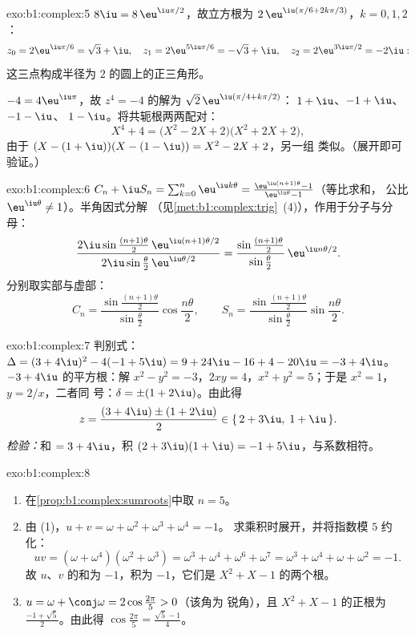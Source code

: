 \begin{solution}{exo:b1:complex:5}
$8\iu = 8\,\eu^{\iu\pi/2}$，故立方根为 $2\,\eu^{\iu(\pi/6 +
2k\pi/3)}$，$k = 0, 1, 2$：
\[
z_0 = 2\eu^{\iu\pi/6} = \sqrt 3 + \iu,\quad
z_1 = 2\eu^{5\iu\pi/6} = -\sqrt 3 + \iu,\quad
z_2 = 2\eu^{3\iu\pi/2} = -2\iu :
\]
这三点构成半径为 $2$ 的圆上的正三角形。

$-4 = 4\eu^{\iu\pi}$，故 $z^4 = -4$ 的解为 $\sqrt 2\,
\eu^{\iu(\pi/4 + k\pi/2)}$：$\;1 + \iu$、$-1 + \iu$、$-1 - \iu$、
$1 - \iu$。将共轭根两两配对：
\[
X^4 + 4 = \bigl(X^2 - 2X + 2\bigr)\bigl(X^2 + 2X + 2\bigr),
\]
由于 $(X - (1+\iu))(X - (1-\iu)) = X^2 - 2X + 2$，另一组
类似。（展开即可验证。）
\end{solution}

\begin{solution}{exo:b1:complex:6}
$C_n + \iu S_n = \sum_{k=0}^{n} \eu^{\iu k\theta} =
\frac{\eu^{\iu(n+1)\theta} - 1}{\eu^{\iu\theta} - 1}$（等比求和，
公比 $\eu^{\iu\theta} \neq 1$）。半角因式分解
（见\cref{met:b1:complex:trig}~(4)），作用于分子与分母：
\[
\frac{2\iu\sin\frac{(n+1)\theta}{2}\, \eu^{\iu(n+1)\theta/2}}
{2\iu\sin\frac{\theta}{2}\, \eu^{\iu\theta/2}}
= \frac{\sin\frac{(n+1)\theta}{2}}{\sin\frac{\theta}{2}}\,
\eu^{\iu n\theta/2}.
\]
分别取实部与虚部：
\[
C_n = \frac{\sin\frac{(n+1)\theta}{2}}{\sin\frac{\theta}{2}}
\cos\frac{n\theta}{2},
\qquad
S_n = \frac{\sin\frac{(n+1)\theta}{2}}{\sin\frac{\theta}{2}}
\sin\frac{n\theta}{2}.
\]
\end{solution}

\begin{solution}{exo:b1:complex:7}
判别式：$\Delta = (3 + 4\iu)^2 - 4(-1 + 5\iu) = 9 + 24\iu - 16 +
4 - 20\iu = -3 + 4\iu$。$-3 + 4\iu$ 的平方根：解 $x^2 - y^2
= -3$，$2xy = 4$，$x^2 + y^2 = 5$；于是 $x^2 = 1$，$y = 2/x$，二者同
号：$\delta = \pm(1 + 2\iu)$。由此得
\[
z = \frac{(3 + 4\iu) \pm (1 + 2\iu)}{2}
\in \{\, 2 + 3\iu,\; 1 + \iu \,\}.
\]
\emph{检验：}和 $= 3 + 4\iu$，积 $(2+3\iu)(1+\iu) = -1 +
5\iu$，与系数相符。
\end{solution}

\begin{solution}{exo:b1:complex:8}
\begin{enumerate}
  \item 在\cref{prop:b1:complex:sumroots}中取 $n = 5$。
  \item 由 (1)，$u + v = \omega + \omega^2 + \omega^3 + \omega^4 = -1$。
        求乘积时展开，并将指数模 $5$ 约化：
        \[
        uv = (\omega + \omega^4)(\omega^2 + \omega^3)
        = \omega^3 + \omega^4 + \omega^6 + \omega^7
        = \omega^3 + \omega^4 + \omega + \omega^2 = -1 .
        \]
        故 $u$、$v$ 的和为 $-1$，积为 $-1$，它们是
        $X^2 + X - 1$ 的两个根。
  \item $u = \omega + \conj\omega = 2\cos\frac{2\pi}{5} > 0$（该角为
        锐角），且 $X^2 + X - 1$ 的正根为
        $\frac{-1 + \sqrt 5}{2}$。由此得 $\cos\frac{2\pi}{5} =
        \frac{\sqrt 5 - 1}{4}$。
\end{enumerate}
\end{solution}

